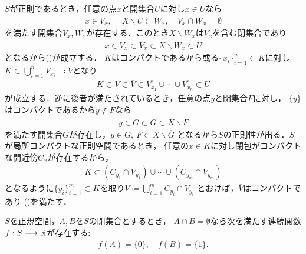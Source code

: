 	\begin{prf}
		$S$が正則であるとき，任意の点$x$と開集合$U$に対し$x \in U$なら
		\begin{align}
			x \in V_x,\ \quad X \backslash U \subset W_x,
			\quad V_x \cap W_x = \emptyset
		\end{align}
		を満たす開集合$V_x,W_x$が存在する．このとき$X \backslash W_x$は$V_x$を含む閉集合であり
		\begin{align}
			x \in V_x \subset \overline{V_x} \subset X \backslash W_x \subset U
		\end{align}
		となるから()が成立する．
		$K$はコンパクトであるから或る$\{x_i\}_{i=1}^n \subset K$に対し
		$K \subset \bigcup_{i=1}^n V_{x_i} \eqqcolon V$となり
		\begin{align}
			K \subset V \subset \overline{V}
			\subset \overline{V_{x_1}} \cup \cdots \cup \overline{V_{x_n}}
			\subset U
		\end{align}
		が成立する．逆に後者が満たされているとき，任意の点$y$と閉集合$F$に対し，
		$\{y\}$はコンパクトであるから$y \notin F$なら
		\begin{align}
			y \in G \subset \overline{G} \subset X \backslash F
		\end{align}
		を満たす開集合$G$が存在し，$y \in G,\ F \subset X \backslash \overline{G}$
		となるから$S$の正則性が出る．$S$が局所コンパクトな正則空間であるとき，
		任意の$x \in K$に対し閉包がコンパクトな開近傍$C_x$が存在するから，
		\begin{align}
			K \subset (C_{y_1} \cap V_{y_1}) \cup \cdots \cup (C_{y_m} \cap V_{y_m})
		\end{align}
		となるように$\{y_i\}_{i=1}^m \subset K$を取り$V \coloneqq \bigcup_{i=1}^m C_{y_i} \cap V_{y_i}$
		とおけば，$\overline{V}$はコンパクトであり
		()を満たす．
		\QED
	\end{prf}
	
	\begin{screen}
		\begin{thm}
			$S$を正規空間，$A,B$を$S$の閉集合とするとき，
			$A \cap B = \emptyset$なら次を満たす連続関数$f:S \longrightarrow \mathbb{R}$が存在する:
			\begin{align}
				f(A) = \{0\}, \quad f(B) = \{1\}.
			\end{align}
		\end{thm}
	\end{screen}
	
